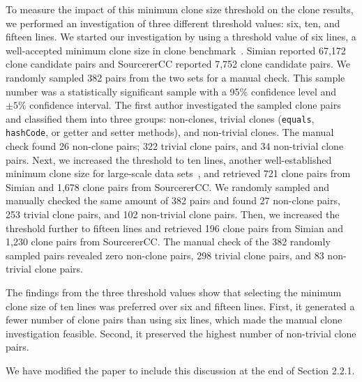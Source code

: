 \documentclass[a4paper,twoside,10pt]{reviewresponse}
\begin{document}
To measure the impact of this minimum clone size threshold on the clone results,
we performed an investigation of three different threshold values: six, ten, and
fifteen lines. We started our investigation by using a threshold value of six
lines, a well-accepted minimum clone size in clone benchmark~\citep{Bellon2007}.
Simian reported 67,172 clone candidate pairs and SourcererCC reported 7,752
clone candidate pairs. We randomly sampled 382 pairs from the two sets for
a manual check. This sample number was a statistically significant sample with a
95\% confidence level and $\pm 5\%$ confidence interval. The first author
investigated the sampled clone pairs and classified them into three groups:
non-clones, trivial clones (\texttt{equals}, \texttt{hashCode}, or getter and
setter methods), and non-trivial clones. The manual check found 26 non-clone
pairs; 322 trivial clone pairs, and 34 non-trivial clone pairs. Next, we
increased the threshold to ten lines, another well-established minimum clone
size for large-scale data sets~\cite{Sajnani2016}, and retrieved 721 clone pairs
from Simian and 1,678 clone pairs from SourcererCC. We randomly sampled and
manually checked the same amount of 382 pairs and found 27 non-clone pairs, 253
trivial clone pairs, and 102 non-trivial clone pairs. Then, we increased the
threshold further to fifteen lines and retrieved 196 clone pairs from Simian and
1,230 clone pairs from SourcererCC. The manual check of the 382 randomly sampled
pairs revealed zero non-clone pairs, 298 trivial clone pairs, and 83 non-trivial
clone pairs.

The findings from the three threshold values show that selecting the minimum
clone size of ten lines was preferred over six and fifteen lines. First, it
generated a fewer number of clone pairs than using six lines, which made the
manual clone investigation feasible. Second, it preserved the highest number of
non-trivial clone pairs.

We have modified the paper to include this discussion at the end of Section
2.2.1.

\end{document}

